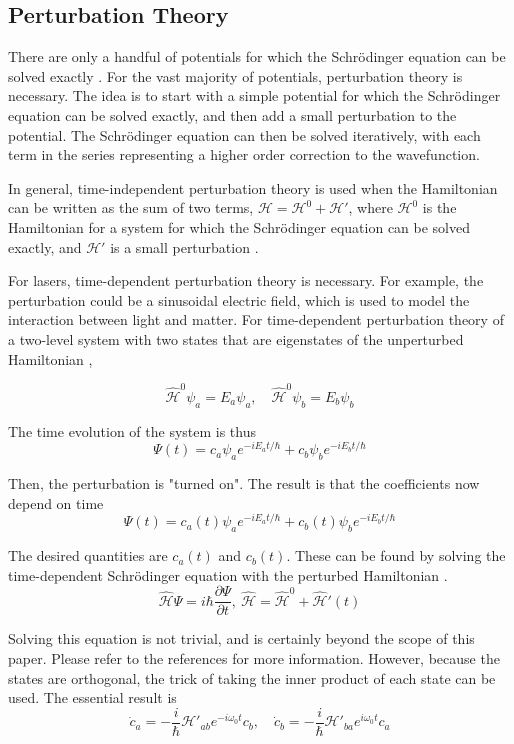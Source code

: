 \documentclass{article}
\newcommand{\p}{\partial}
\renewcommand{\H}{\mathcal{H}}
\begin{document}
\subsection*{Perturbation Theory}


There are only a handful of potentials for which the Schr\"odinger equation can be solved exactly \cite{Griffiths}. For the vast majority of potentials, perturbation theory is necessary. The idea is to start with a simple potential for which the Schr\"odinger equation can be solved exactly, and then add a small perturbation to the potential. The Schr\"odinger equation can then be solved iteratively, with each term in the series representing a higher order correction to the wavefunction. 

In general, time-independent perturbation theory is used when the Hamiltonian can be written as the sum of two terms, $\H = \H^0 + \H'$, where $\H^0$ is the Hamiltonian for a system for which the Schr\"odinger equation can be solved exactly, and $\H'$ is a small perturbation \cite{Griffiths}.

For lasers, time-dependent perturbation theory is necessary. For example, the perturbation could be a sinusoidal electric field, which is used to model the interaction between light and matter. For time-dependent perturbation theory of a two-level system with two states that are eigenstates of the unperturbed Hamiltonian \cite{Griffiths},

\[ \hat{\H}^0\psi_a = E_a\psi_a,\quad \hat{\H}^0\psi_b = E_b\psi_b \]

The time evolution of the system is thus 
\[ \Psi(t) = c_a\psi_ae^{-iE_at/\hbar} + c_b\psi_be^{-iE_bt/\hbar} \]

Then, the perturbation is "turned on". The result is that the coefficients now depend on time 
\[ \Psi(t) = c_a(t)\psi_ae^{-iE_at/\hbar} + c_b(t)\psi_be^{-iE_bt/\hbar} \]

The desired quantities are $c_a(t)$ and $c_b(t)$. These can be found by solving the time-dependent Schr\"odinger equation with the perturbed Hamiltonian \cite{Griffiths}. 
\[ \hat{\H}\Psi = i\hbar\frac{\p\Psi}{\p t},\ \hat{\H} = \hat{\H}^0 + \hat{\H}'(t) \]

Solving this equation is not trivial, and is certainly beyond the scope of this paper. Please refer to the references for more information. However, because the states are orthogonal, the trick of taking the inner product of each state can be used. The essential result is \cite{Griffiths}
\begin{equation}
     \dot{c}_a = -\frac{i}{\hbar}\H'_{ab}e^{-i\omega_0t}c_b,\quad \dot{c}_b = -\frac{i}{\hbar}\H'_{ba}e^{i\omega_0t}c_a 
\end{equation}
\end{document}
